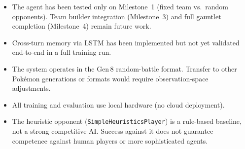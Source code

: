 \begin{itemize}
  \item The agent has been tested only on Milestone~1 (fixed team vs.\ random
        opponents).  Team builder integration (Milestone~3) and full gauntlet
        completion (Milestone~4) remain future work.
  \item Cross-turn memory via LSTM has been implemented but not yet validated
        end-to-end in a full training run.
  \item The system operates in the Gen\,8 random-battle format.  Transfer to
        other Pok\'{e}mon generations or formats would require observation-space
        adjustments.
  \item All training and evaluation use local hardware (no cloud deployment).
  \item The heuristic opponent (\texttt{SimpleHeuristicsPlayer}) is a
        rule-based baseline, not a strong competitive AI.  Success against it
        does not guarantee competence against human players or more
        sophisticated agents.
\end{itemize}
